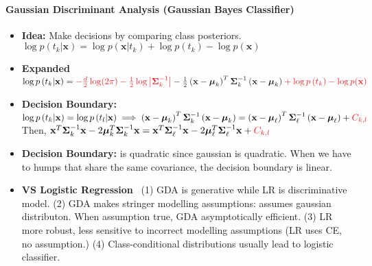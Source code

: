 \documentclass[10pt]{article}
\begin{document}
\paragraph{Gaussian Discriminant Analysis (Gaussian Bayes Classifier)}
\begin{itemize}
    \setlength\itemsep{-0.4em}
    \item \textbf{Idea:} Make decisions by comparing class posteriors. $\log p\left(t_{k} | \mathbf{x}\right)=\log p\left(\mathbf{x} | t_{k}\right)+\log p\left(t_{k}\right)-\log p(\mathbf{x})$
    \item \textbf{Expanded} $ \log p\left(t_{k} | \mathbf{x}\right) = \color{Red} -\frac{d}{2} \log (2 \pi) -\frac{1}{2} \log \left|\boldsymbol{\Sigma}_{k}^{-1}\right| \color{Black}-\frac{1}{2}\left(\mathbf{x}-\boldsymbol{\mu}_{k}\right)^{T} \boldsymbol{\Sigma}_{k}^{-1}\left(\mathbf{x}-\boldsymbol{\mu}_{k}\right) \color{Red} +\log p\left(t_{k}\right)-\log p(\mathbf{x})\color{Black}$
    \item \textbf{Decision Boundary:} $\log p\left(t_{k} | \mathbf{x}\right)=\log p\left(t_{l} | \mathbf{x}\right) \implies \left(\mathbf{x}-\boldsymbol{\mu}_{k}\right)^{T} \boldsymbol{\Sigma}_{k}^{-1}\left(\mathbf{x}-\boldsymbol{\mu}_{k}\right)=\left(\mathbf{x}-\boldsymbol{\mu}_{\ell}\right)^{T} \boldsymbol{\Sigma}_{\ell}^{-1}\left(\mathbf{x}-\boldsymbol{\mu}_{\ell}\right)+\color{Red}C_{k, l}\color{Black}$ \\Then, $\mathbf{x}^{T} \boldsymbol{\Sigma}_{k}^{-1} \mathbf{x}-2 \boldsymbol{\mu}_{k}^{T} \mathbf{\Sigma}_{k}^{-1} \mathbf{x}=\mathbf{x}^{T} \mathbf{\Sigma}_{\ell}^{-1} \mathbf{x}-2 \boldsymbol{\mu}_{\ell}^{T} \mathbf{\Sigma}_{\ell}^{-1} \mathbf{x}+\color{Red}C_{k, l}\color{Black}$
    \item \textbf{Decision Boundary:} is quadratic since gaussian is quadratic. When we have to humps that share the same covariance, the decision boundary is linear. 
    \item \textbf{VS Logistic Regression}~ (1) GDA is generative while LR is discriminative model. (2) GDA makes stringer modelling assumptions: assumes gaussian distributon. When assumption true, GDA asymptotically efficient. (3) LR more robust, less sensitive to incorrect modelling assumptions (LR uses CE, no assumption.) (4) Class-conditional distributions usually lead to logistic classifier. 
\end{itemize}
\end{document}
